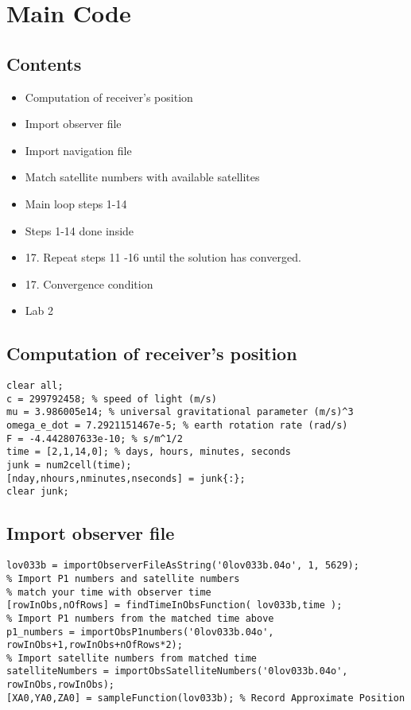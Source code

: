 \section{Main Code} %
\label{sec:main_code}

\subsection*{Contents}

\begin{itemize}
\setlength{\itemsep}{-1ex}
   \item Computation of receiver's position
   \item Import observer file
   \item Import navigation file
   \item Match satellite numbers with available satellites
   \item Main loop steps 1-14
   \item Steps 1-14 done inside
   \item 17. Repeat steps 11 -16 until the solution has converged.
   \item 17. Convergence condition
   \item Lab 2
\end{itemize}


\subsection*{Computation of receiver's position}

\begin{verbatim}
clear all;
c = 299792458; % speed of light (m/s)
mu = 3.986005e14; % universal gravitational parameter (m/s)^3
omega_e_dot = 7.2921151467e-5; % earth rotation rate (rad/s)
F = -4.442807633e-10; % s/m^1/2
time = [2,1,14,0]; % days, hours, minutes, seconds
junk = num2cell(time);
[nday,nhours,nminutes,nseconds] = junk{:};
clear junk;
\end{verbatim}


\subsection*{Import observer file}

\begin{verbatim}
lov033b = importObserverFileAsString('0lov033b.04o', 1, 5629);
% Import P1 numbers and satellite numbers
% match your time with observer time
[rowInObs,nOfRows] = findTimeInObsFunction( lov033b,time ); 
% Import P1 numbers from the matched time above
p1_numbers = importObsP1numbers('0lov033b.04o', rowInObs+1,rowInObs+nOfRows*2); 
% Import satellite numbers from matched time
satelliteNumbers = importObsSatelliteNumbers('0lov033b.04o', rowInObs,rowInObs); 
[XA0,YA0,ZA0] = sampleFunction(lov033b); % Record Approximate Position
\end{verbatim}


